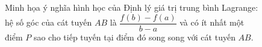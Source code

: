 \begin{figure}[H]
    \caption{\centering Minh họa ý nghĩa hình học của Định lý giá trị trung bình Lagrange: hệ số góc của cát tuyến $AB$ là $\dfrac{f(b)-f(a)}{b-a}$ và có ít nhất một điểm $P$ sao cho tiếp tuyến tại điểm đó song song với cát tuyến $AB$.}
    \label{fig:lagrange-theorem}
\end{figure}
